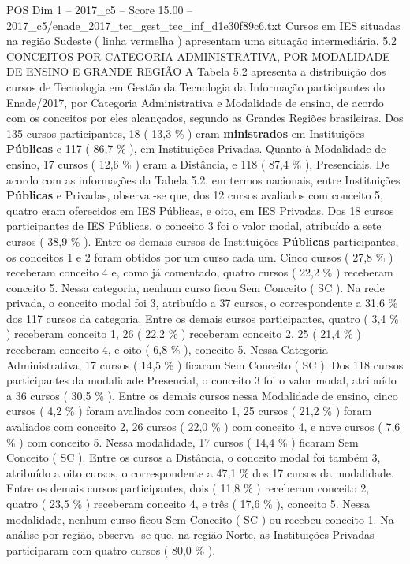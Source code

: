 \begin{textsample}{POS Dim 1 – 2017\_c5 – Score 15.00 – 2017\_c5/enade\_2017\_tec\_gest\_tec\_inf\_d1e30f89c6.txt}
Cursos em IES situadas na região Sudeste ( linha vermelha ) apresentam uma situação intermediária. 5.2 CONCEITOS POR CATEGORIA ADMINISTRATIVA, POR MODALIDADE DE ENSINO E GRANDE REGIÃO A Tabela 5.2 apresenta a distribuição dos cursos de Tecnologia em Gestão da Tecnologia da Informação participantes do Enade/2017, por Categoria Administrativa e Modalidade de ensino, de acordo com os conceitos por eles alcançados, segundo as Grandes Regiões brasileiras.
Dos 135 cursos participantes, 18 ( 13,3 \% ) eram \textbf{ministrados} em Instituições \textbf{Públicas} e 117 ( 86,7 \% ), em Instituições Privadas.
Quanto à Modalidade de ensino, 17 cursos ( 12,6 \% ) eram a Distância, e 118 ( 87,4 \% ), Presenciais.
De acordo com as informações da Tabela 5.2, em termos nacionais, entre Instituições \textbf{Públicas} e Privadas, observa -se que, dos 12 cursos avaliados com conceito 5, quatro eram oferecidos em IES Públicas, e oito, em IES Privadas.
Dos 18 cursos participantes de IES Públicas, o conceito 3 foi o valor modal, atribuído a sete cursos ( 38,9 \% ).
Entre os demais cursos de Instituições \textbf{Públicas} participantes, os conceitos 1 e 2 foram obtidos por um curso cada um.
Cinco cursos ( 27,8 \% ) receberam conceito 4 e, como já comentado, quatro cursos ( 22,2 \% ) receberam conceito 5.
Nessa categoria, nenhum curso ficou Sem Conceito ( SC ).
Na rede privada, o conceito modal foi 3, atribuído a 37 cursos, o correspondente a 31,6 \% dos 117 cursos da categoria.
Entre os demais cursos participantes, quatro ( 3,4 \% ) receberam conceito 1, 26 ( 22,2 \% ) receberam conceito 2, 25 ( 21,4 \% ) receberam conceito 4, e oito ( 6,8 \% ), conceito 5.
Nessa Categoria Administrativa, 17 cursos ( 14,5 \% ) ficaram Sem Conceito ( SC ).
Dos 118 cursos participantes da modalidade Presencial, o conceito 3 foi o valor modal, atribuído a 36 cursos ( 30,5 \% ).
Entre os demais cursos nessa Modalidade de ensino, cinco cursos ( 4,2 \% ) foram avaliados com conceito 1, 25 cursos ( 21,2 \% ) foram avaliados com conceito 2, 26 cursos ( 22,0 \% ) com conceito 4, e nove cursos ( 7,6 \% ) com conceito 5.
Nessa modalidade, 17 cursos ( 14,4 \% ) ficaram Sem Conceito ( SC ).
Entre os cursos a Distância, o conceito modal foi também 3, atribuído a oito cursos, o correspondente a 47,1 \% dos 17 cursos da modalidade.
Entre os demais cursos participantes, dois ( 11,8 \% ) receberam conceito 2, quatro ( 23,5 \% ) receberam conceito 4, e três ( 17,6 \% ), conceito 5.
Nessa modalidade, nenhum curso ficou Sem Conceito ( SC ) ou recebeu conceito 1.
Na análise por região, observa -se que, na região Norte, as Instituições Privadas participaram com quatro cursos ( 80,0 \% ).

\end{textsample}
